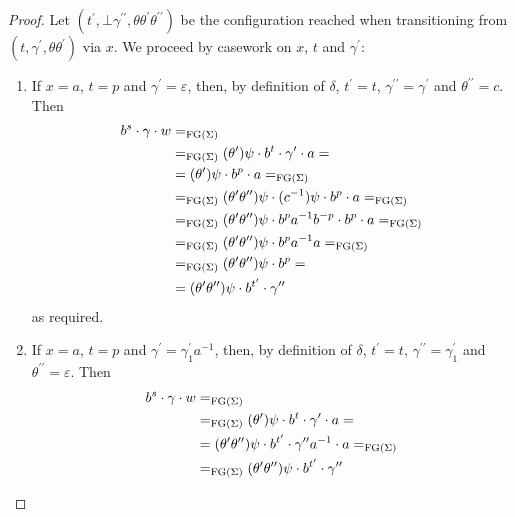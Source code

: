 \begin{proof}
  Let $(t^\prime, \bot \gamma^{\prime\prime}, \theta\theta^\prime\theta^{\prime\prime})$ be the configuration reached
  when transitioning from $(t, \gamma^\prime, \theta\theta^\prime)$ via $x$.
  We proceed by casework on $x$, $t$ and $\gamma^\prime$:
  \begin{enumerate}[1)]
    \item If $x = a$, $t = p$ and $\gamma^\prime = \varepsilon$, then, by definition of $\delta$,
      $t^\prime = t$, $\gamma^{\prime\prime} = \gamma^\prime$ and $\theta^{\prime\prime} = c$. Then
    \begin{align*}
      b^s \cdot \gamma \cdot w &=_{\textrm{FG}(\Sigma)}\\
      &=_{\textrm{FG}(\Sigma)}
      (\theta^\prime)\psi \cdot b^{t} \cdot \gamma^\prime \cdot a =\\
      &=
      (\theta^{\prime})\psi \cdot b^{p} \cdot a =_{\textrm{FG}(\Sigma)}\\
      &=_{\textrm{FG}(\Sigma)}
      (\theta^\prime\theta^{\prime\prime})\psi \cdot (c^{-1})\psi \cdot b^{p} \cdot a  =_{\textrm{FG}(\Sigma)}\\
      &=_{\textrm{FG}(\Sigma)}
      (\theta^\prime\theta^{\prime\prime})\psi \cdot b^p a^{-1} b^{-p} \cdot b^{p} \cdot a  =_{\textrm{FG}(\Sigma)}\\
      &=_{\textrm{FG}(\Sigma)}
      (\theta^\prime\theta^{\prime\prime})\psi \cdot b^p a^{-1} a  =_{\textrm{FG}(\Sigma)}\\
      &=_{\textrm{FG}(\Sigma)}
      (\theta^\prime\theta^{\prime\prime})\psi \cdot b^p  =\\
      &=
      (\theta^\prime\theta^{\prime\prime})\psi \cdot b^{t^\prime} \cdot \gamma^{\prime\prime}
    \end{align*}
    as required.
  \item If $x = a$, $t = p$ and $\gamma^\prime = \gamma_1^\prime a^{-1}$, then, by definition of $\delta$,
    $t^\prime = t$, $\gamma^{\prime\prime} = \gamma_1^\prime$ and $\theta^{\prime\prime} = \varepsilon$. Then
    \begin{align*}
      b^s \cdot \gamma \cdot w &=_{\textrm{FG}(\Sigma)}\\
      &=_{\textrm{FG}(\Sigma)}
      (\theta^\prime)\psi \cdot b^{t} \cdot \gamma^\prime \cdot a =\\
      &=
      (\theta^{\prime}\theta^{\prime\prime})\psi \cdot b^{t^\prime} \cdot \gamma^{\prime\prime} a^{-1} \cdot a
      =_{\textrm{FG}(\Sigma)}\\
      &=_{\textrm{FG}(\Sigma)}
      (\theta^\prime\theta^{\prime\prime})\psi \cdot b^{t^\prime} \cdot \gamma^{\prime\prime}
    \end{align*}

\end{enumerate}
\end{proof}
